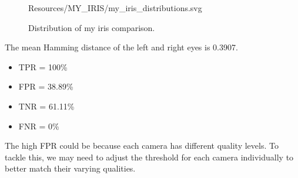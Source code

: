 \documentclass{article}
\begin{document}
\begin{figure}[ht!]
  \centering
  \def\svgscale{0.7}
   {Resources/MY_IRIS/my_iris_distributions.svg}
  \caption{Distribution of my iris comparison.}
  \label{my_iris_distributions}
\end{figure}

\newpage

The mean Hamming distance of the left and right eyes is 0.3907.

\begin{itemize}
  \item TPR = 100\%
  \item FPR = 38.89\%
  \item TNR = 61.11\%
  \item FNR = 0\%
\end{itemize}

The high FPR could be because each camera has different quality levels. 
To tackle this, we may need to adjust the threshold for each camera individually to better match their varying qualities.



\nocite{circle_hough_transform}
\end{document}
